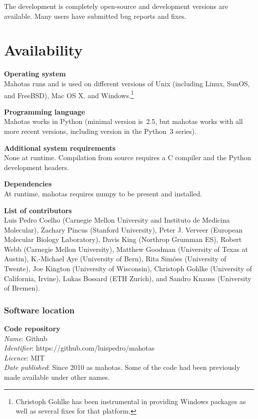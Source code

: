 \documentclass{scrartcl}
\newcommand*{\cpp}{{C\nolinebreak[4]\hspace{-.05em}\raisebox{.4ex}{\tiny\textbf{++}}}}
\begin{document}
The development is completely open-source and development versions are
available. Many users have submitted bug reports and fixes.

\section{Availability}

\textbf{Operating system}\\
Mahotas runs and is used on different versions of Unix (including Linux, SunOS,
and FreeBSD), Mac OS X, and Windows.\footnote{Christoph Gohlke has been
instrumental in providing Windows packages as well as several fixes for that
platform.}


\textbf{Programming language}\\
Mahotas works in Python (minimal version is~2.5, but mahotas works with all
more recent versions, including version in the Python~3 series).

\textbf{Additional system requirements}\\
None at runtime. Compilation from source requires a \cpp{} compiler and the
Python development headers.

\textbf{Dependencies}\\
At runtime, mahotas requires numpy to be present and installed.

\textbf{List of contributors}\\
Luis Pedro Coelho (Carnegie Mellon University and Instituto de Medicina
Molecular), Zachary Pincus (Stanford University), Peter J. Verveer (European
Molecular Biology Laboratory), Davis King (Northrop Grumman ES), Robert Webb
(Carnegie Mellon University), Matthew Goodman (University of Texas at Austin),
K.-Michael Aye (University of Bern), Rita Sim\~{o}es (University of Twente),
Joe Kington (University of Wisconsin), Christoph Gohlke (University of
California, Irvine), Lukas Bossard (ETH Zurich), and Sandro Knauss (University
of Bremen).

\subsubsection{Software location}

\textbf{Code repository}\\
\textit{Name}: Github\\
\textit{Identifier}: https://github.com/luispedro/mahotas\\
\textit{Licence}: MIT\\
\textit{Date published}: Since 2010 as mahotas. Some of the code had been
previously made available under other names.
\end{document}
